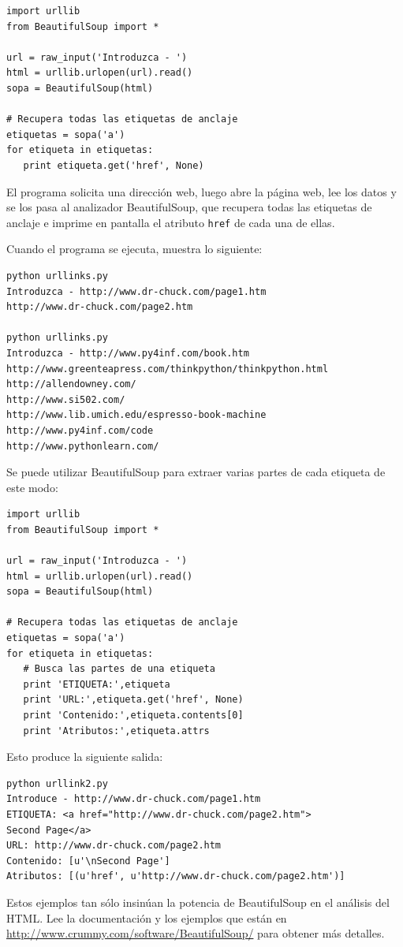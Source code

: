 \beforeverb
\begin{verbatim}
import urllib
from BeautifulSoup import *

url = raw_input('Introduzca - ')
html = urllib.urlopen(url).read()
sopa = BeautifulSoup(html)

# Recupera todas las etiquetas de anclaje
etiquetas = sopa('a')
for etiqueta in etiquetas:
   print etiqueta.get('href', None)
\end{verbatim}
\afterverb
%
El programa solicita una dirección web, luego abre la página
web, lee los datos y se los pasa al analizador BeautifulSoup,
que recupera todas las etiquetas de anclaje e imprime en pantalla
el atributo {\tt href} de cada una de ellas.

Cuando el programa se ejecuta, muestra lo siguiente:

\beforeverb
\begin{verbatim}
python urllinks.py 
Introduzca - http://www.dr-chuck.com/page1.htm
http://www.dr-chuck.com/page2.htm

python urllinks.py 
Introduzca - http://www.py4inf.com/book.htm
http://www.greenteapress.com/thinkpython/thinkpython.html
http://allendowney.com/
http://www.si502.com/
http://www.lib.umich.edu/espresso-book-machine
http://www.py4inf.com/code
http://www.pythonlearn.com/
\end{verbatim}
\afterverb
%
Se puede utilizar BeautifulSoup para extraer varias partes de cada
etiqueta de este modo:

\beforeverb
\begin{verbatim}
import urllib
from BeautifulSoup import *

url = raw_input('Introduzca - ')
html = urllib.urlopen(url).read()
sopa = BeautifulSoup(html)

# Recupera todas las etiquetas de anclaje
etiquetas = sopa('a')
for etiqueta in etiquetas:
   # Busca las partes de una etiqueta
   print 'ETIQUETA:',etiqueta
   print 'URL:',etiqueta.get('href', None)
   print 'Contenido:',etiqueta.contents[0]
   print 'Atributos:',etiqueta.attrs
\end{verbatim}
\afterverb
%
Esto produce la siguiente salida:

\beforeverb
\begin{verbatim}
python urllink2.py 
Introduce - http://www.dr-chuck.com/page1.htm
ETIQUETA: <a href="http://www.dr-chuck.com/page2.htm">
Second Page</a>
URL: http://www.dr-chuck.com/page2.htm
Contenido: [u'\nSecond Page']
Atributos: [(u'href', u'http://www.dr-chuck.com/page2.htm')]
\end{verbatim}
\afterverb
%
Estos ejemplos tan sólo insinúan la potencia de BeautifulSoup
en el análisis del HTML. Lee la documentación y
los ejemplos que están en
\url{http://www.crummy.com/software/BeautifulSoup/} para obtener más detalles.

